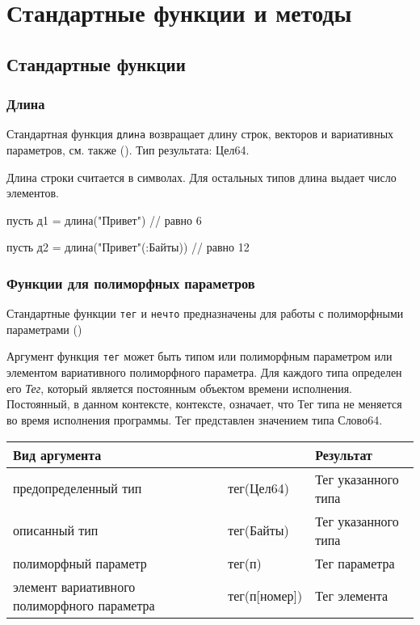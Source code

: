 \hypertarget{stdfuncs}{%
\section{Стандартные функции и методы}\label{stdfuncs:chapter}}

\hypertarget{std-funcs}{%
\subsection{Стандартные функции}\label{stdfuncs:std-funcs}}

\hypertarget{stdlen}{%
\subsubsection{Длина}\label{stdfuncs:stdlen}}

Стандартная функция \verb+длина+ возвращает длину строк, векторов и вариативных параметров, см. также (). Тип результата: Цел64.

Длина строки считается в символах. Для остальных типов длина выдает число элементов.

\begin{Trivil}
    пусть д1 = длина("Привет") // равно 6

    пусть д2 = длина("Привет"(:Байты)) // равно 12
\end{Trivil}

\hypertarget{stdpoly}{%
\subsubsection{Функции для полиморфных параметров}\label{stdfuncs:stdpoly}}

Стандартные функции \verb+тег+ и \verb+нечто+ предназначены для работы с полиморфными параметрами ()

Аргумент функция \verb+тег+ может быть типом или полиморфным параметром или элементом вариативного полиморфного параметра. 
Для каждого типа определен его \emph{Тег}, который является постоянным объектом времени исполнения. 
Постоянный, в данном контексте, контексте, означает, что Тег типа не меняется во время исполнения программы.
Тег представлен значением типа Слово64.

\bigskip
\begin{tabular}[c]{p{4cm}|l|l}
 \multicolumn{2}{l|}{\textbf{Вид аргумента}}   & \textbf{Результат}  \\ 
\hline
предопределенный тип & тег(Цел64) &  Тег указанного типа \\
описанный тип & тег(Байты) &  Тег указанного типа \\
полиморфный параметр & тег(п) & Тег параметра \\
элемент вариативного полиморфного параметра & тег(п[номер]) & Тег элемента \\
\hline
\end{tabular}

